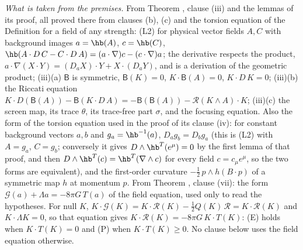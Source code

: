 \emph{What is taken from the premises.} From Theorem , clause (iii) and the lemmas of its proof, all proved there from clauses (b), (c) and the torsion equation of the Definition for a field of any strength: (L2) for physical vector fields $A, C$ with background images $a = \hb(A)$, $c = \hb(C)$, $\hb(A \cdot D\,C - C \cdot D\,A) = (a \cdot \nabla)c - (c \cdot \nabla)a$; the derivative respects the product, $a \cdot \nabla(X \cdot Y) = (D_{a}X) \cdot Y + X \cdot (D_{a}Y)$, and is a derivation of the geometric product; (iii)(a) $\mathsf{B}$ is symmetric, $\mathsf{B}(K) = 0$, $K \cdot \mathsf{B}(A) = 0$, $K \cdot D\,K = 0$; (iii)(b) the Riccati equation $K \cdot D(\mathsf{B}(A)) - \mathsf{B}(K \cdot D\,A) = -\mathsf{B}(\mathsf{B}(A)) - \mathcal{R}(K \wedge A) \cdot K$; (iii)(c) the screen map, its trace $\theta$, its trace-free part $\sigma$, and the focusing equation. Also the form of the torsion equation used in the proof of its clause (iv): for constant background vectors $a, b$ and $g_{a} = \hb^{-1}(a)$, $D_{a}g_{b} = D_{b}g_{a}$ (this is (L2) with $A = g_{a}$, $C = g_{b}$; conversely it gives $D \wedge \hb^{T}(e^{\mu}) = 0$ by the first lemma of that proof, and then $D \wedge \hb^{T}(c) = \hb^{T}(\nabla \wedge c)$ for every field $c = c_{\mu}e^{\mu}$, so the two forms are equivalent), and the first-order curvature $-\tfrac12\,p \wedge h(B \cdot p)$ of a symmetric map $h$ at momentum $p$. From Theorem , clause (vii): the form $\mathcal{G}(a) + \Lambda a = -8\pi G\,T(a)$ of the field equation, used only to read the hypotheses. For null $K$, $K \cdot \mathcal{G}(K) = K \cdot \mathcal{R}(K) - \tfrac12 Q(K)\,\mathcal{R} = K \cdot \mathcal{R}(K)$ and $K \cdot \Lambda K = 0$, so that equation gives $K \cdot \mathcal{R}(K) = -8\pi G\,K \cdot T(K)$: (E) holds when $K \cdot T(K) = 0$ and (P) when $K \cdot T(K) \geq 0$. No clause below uses the field equation otherwise.


